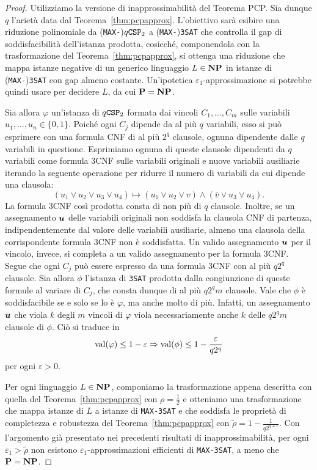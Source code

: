 \begin{proof}
	Utilizziamo la versione di inapprossimabilità del Teorema PCP.
	Sia dunque $q$ l'arietà data dal Teorema~\ref{thm:pcpapprox}.
	L'obiettivo sarà esibire una riduzione polinomiale da
	(\texttt{MAX-})$q\mathtt{CSP}_2$ a (\texttt{MAX-})\texttt{3SAT} che controlla il
	gap di soddisfacibilità dell'istanza prodotta, cosicché, componendola
	con la trasformazione del Teorema~\ref{thm:pcpapprox}, si ottenga una
	riduzione che mappa istanze negative di un generico linguaggio
	$L \in \mathbf{NP}$ in istanze di (\texttt{MAX-})\texttt{3SAT} con gap almeno
	costante. Un'ipotetica $\varepsilon_1$-approssimazione si potrebbe quindi
	usare per decidere $L$, da cui $\mathbf{P} = \mathbf{NP}$.

	Sia allora $\varphi$ un'istanza di $q\mathtt{CSP}_2$ formata dai vincoli
	$C_1, \dots, C_m$ sulle variabili $u_1, \dots, u_n \in \{0, 1\}$.
	Poiché ogni $C_j$ dipende da al più $q$ variabili, esso si può esprimere
	con una formula CNF di al più $2^q$ clausole, ognuna dipendente dalle $q$
	variabili in questione.
	Esprimiamo ognuna di queste clausole dipendenti da $q$ variabili come
	formula 3CNF sulle variabili originali e nuove variabili ausiliarie iterando
	la seguente operazione per ridurre il numero di variabili da cui dipende una
	clausola:
	\[
		(u_1 \lor u_2 \lor u_3 \lor u_4) \mapsto
		(u_1 \lor u_2 \lor v) \land (\bar{v} \lor u_3 \lor u_4).
	\]
	La formula 3CNF così prodotta consta di non più di $q$ clausole. Inoltre,
	se un assegnamento $\bm{u}$ delle variabili originali non soddisfa la
	clausola CNF di partenza, indipendentemente dal valore delle variabili
	ausiliarie, almeno una clausola della corrispondente formula 3CNF non è
	soddisfatta. Un valido assegnamento $\bm{u}$ per il vincolo, invece, si
	completa a un valido assegnamento per la formula 3CNF.
	Segue che ogni $C_j$ può essere espresso da una formula 3CNF con al più
	$q 2^q$ clausole. Sia allora $\phi$ l'istanza di \texttt{3SAT} prodotta
	dalla congiunzione di queste formule al variare di $C_j$, che consta dunque
	di al più $q 2^q m$ clausole.
	Vale che $\phi$ è soddisfacibile se e solo se lo è $\varphi$, ma anche
	molto di più. Infatti, un assegnamento $\bm{u}$ che viola $k$ degli $m$
	vincoli di $\varphi$ viola necessariamente anche $k$ delle $q 2^q m$
	clausole di $\phi$. Ciò si traduce in
	\[
		\operatorname{val}(\varphi) \le 1 - \varepsilon \Rightarrow
		\operatorname{val}(\phi) \le 1 - \frac{\varepsilon}{q 2^q}
	\]
	per ogni $\varepsilon > 0$.

	Per ogni linguaggio $L \in \mathbf{NP}$, componiamo la trasformazione appena
	descritta con quella del Teorema~\ref{thm:pcpapprox} con $\rho = \frac12$ e
	otteniamo una trasformazione che mappa istanze di $L$ a istanze di
	\texttt{MAX-3SAT} e che soddisfa le proprietà di completezza e robustezza del
	Teorema~\ref{thm:pcpapprox} con $\tilde\rho = 1 - \frac1{q 2^{q + 1}}$.
	Con l'argomento già presentato nei precedenti risultati di inapprossimabilità,
	per ogni $\varepsilon_1 > \tilde\rho$ non esistono
	$\varepsilon_1$-approssimazioni efficienti di \texttt{MAX-3SAT},
	a meno che $\mathbf{P} = \mathbf{NP}$.
\end{proof}


